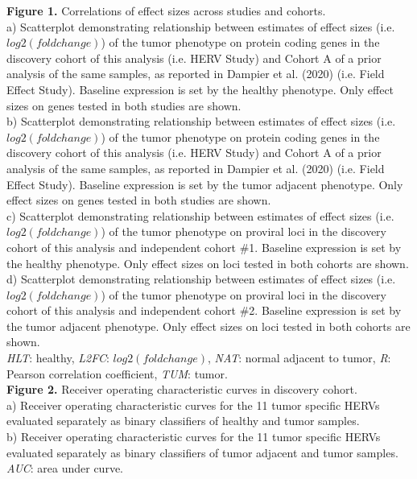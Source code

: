 \textbf{Figure 1.} Correlations of effect sizes across studies and cohorts. \\
a) Scatterplot demonstrating relationship between estimates of effect sizes (i.e. $log2(fold change)$) of the tumor phenotype on protein coding genes in the discovery cohort of this analysis (i.e. HERV Study) and Cohort A of a prior analysis of the same samples, as reported in Dampier et al. (2020) \citep{Dampier2020} (i.e. Field Effect Study).
Baseline expression is set by the healthy phenotype.
Only effect sizes on genes tested in both studies are shown. \\
b) Scatterplot demonstrating relationship between estimates of effect sizes (i.e. $log2(fold change)$) of the tumor phenotype on protein coding genes in the discovery cohort of this analysis (i.e. HERV Study) and Cohort A of a prior analysis of the same samples, as reported in Dampier et al. (2020) \citep{Dampier2020} (i.e. Field Effect Study).
Baseline expression is set by the tumor adjacent phenotype.
Only effect sizes on genes tested in both studies are shown. \\
c) Scatterplot demonstrating relationship between estimates of effect sizes (i.e. $log2(fold change)$) of the tumor phenotype on proviral loci in the discovery cohort of this analysis and independent cohort \#1.
Baseline expression is set by the healthy phenotype.
Only effect sizes on loci tested in both cohorts are shown. \\
d) Scatterplot demonstrating relationship between estimates of effect sizes (i.e. $log2(fold change)$) of the tumor phenotype on proviral loci in the discovery cohort of this analysis and independent cohort \#2.
Baseline expression is set by the tumor adjacent phenotype.
Only effect sizes on loci tested in both cohorts are shown.\\
\emph{HLT}: healthy, \emph{L2FC}: $log2(fold change)$, \emph{NAT}: normal adjacent to tumor, \emph{R}: Pearson correlation coefficient, \emph{TUM}: tumor. \\

\textbf{Figure 2.} Receiver operating characteristic curves in discovery cohort. \\
a) Receiver operating characteristic curves for the 11 tumor specific HERVs evaluated separately as binary classifiers of healthy and tumor samples. \\
b) Receiver operating characteristic curves for the 11 tumor specific HERVs evaluated separately as binary classifiers of tumor adjacent and tumor samples. \\
\emph{AUC}: area under curve. \\

